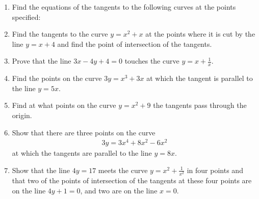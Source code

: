 \begin{enumerate}[1.]
\item Find the equations of the tangents to the following curves at the points specified:
\begin{multicols}{2}
\end{multicols}
\item Find the tangents to the curve $y=x^2+x$ at the points where it is cut by
the line $y=x+4$ and find the point of intersection of the tangents.
\item Prove that the line $3x-4y+4=0$ touches the curve $y=x+\frac{1}{x}$.
\item Find the points on the curve $3y=x^3+3x$ at which the tangent is
parallel to the line $y=5x$.
\item Find at what points on the curve $y=x^2+9$ the tangents pass through the origin.
\item Show that there are three points on the curve
\begin{align*}
3y=3x^4+8x^2-6x^2
\end{align*}
at which the tangents are parallel to the line $y=8x$.
\item Show that the  line $4y=17$ meets the curve $y = x^2+\frac{1}{x^2}$ in four points and that two of the points of intersection of the tangents at these
four points are on the line  $4y+1=0$, and two are on the line $x=0$.
\end{enumerate}
